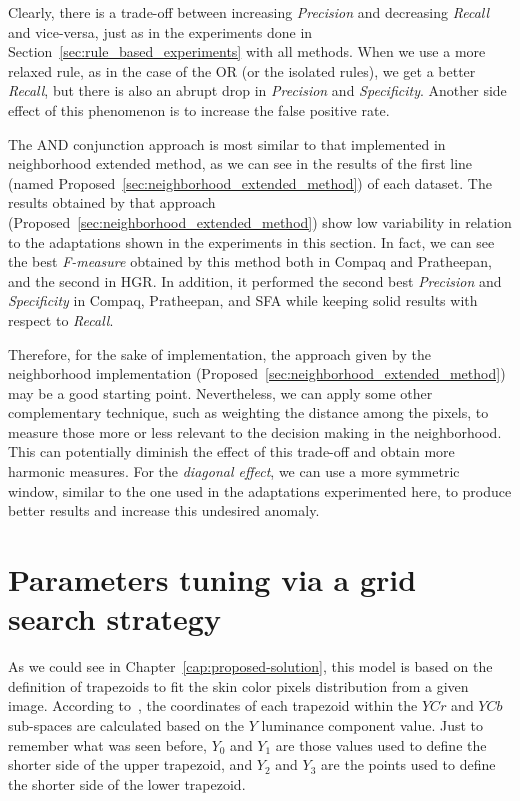 Clearly, there is a trade-off between increasing \emph{Precision} and decreasing \emph{Recall} and vice-versa, just as in the experiments done in Section~\ref{sec:rule_based_experiments} with all methods. When we use a more relaxed rule, as in the case of the OR (or the isolated rules), we get a better \emph{Recall}, but there is also an abrupt drop in \emph{Precision} and \emph{Specificity}. Another side effect of this phenomenon is to increase the false positive rate.

The AND conjunction approach is most similar to that implemented in neighborhood extended method, as we can see in the results of the first line (named Proposed~\ref{sec:neighborhood_extended_method}) of each dataset. The results obtained by that approach (Proposed~\ref{sec:neighborhood_extended_method}) show low variability in relation to the adaptations shown in the experiments in this section. In fact, we can see the best \emph{F-measure} obtained by this method both in Compaq and Pratheepan, and the second in HGR. In addition, it performed the second best \emph{Precision} and \emph{Specificity} in Compaq, Pratheepan, and SFA while keeping solid results with respect to \emph{Recall}.

Therefore, for the sake of implementation, the approach given by the neighborhood implementation (Proposed~\ref{sec:neighborhood_extended_method}) may be a good starting point. Nevertheless, we can apply some other complementary technique, such as weighting the distance among the pixels, to measure those more or less relevant to the decision making in the neighborhood. This can potentially diminish the effect of this trade-off and obtain more harmonic measures. For the \textit{diagonal effect}, we can use a more symmetric window, similar to the one used in the adaptations experimented here, to produce better results and increase this undesired anomaly.


\section{Parameters tuning via a grid search strategy}
\label{sec:grid_search_experiments}
As we could see in Chapter~\ref{cap:proposed-solution}, this model is based on the definition of trapezoids to fit the skin color pixels distribution from a given image. According to~\citet{brancati:17}, the coordinates of each trapezoid within the $YCr$ and $YCb$ sub-spaces are calculated based on the $Y$ luminance component value. Just to remember what was seen before, $Y_0$ and $Y_1$ are those values used to define the shorter side of the upper trapezoid, and $Y_2$ and $Y_3$ are the points used to define the shorter side of the lower trapezoid.

